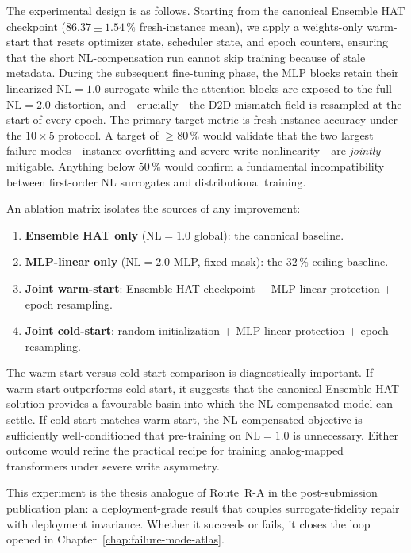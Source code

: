 The experimental design is as follows.  Starting from the canonical Ensemble HAT checkpoint ($86.37\pm1.54\,\%$ fresh-instance mean), we apply a weights-only warm-start that resets optimizer state, scheduler state, and epoch counters, ensuring that the short NL-compensation run cannot skip training because of stale metadata.  During the subsequent fine-tuning phase, the MLP blocks retain their linearized $\mathrm{NL}=1.0$ surrogate while the attention blocks are exposed to the full $\mathrm{NL}=2.0$ distortion, and---crucially---the D2D mismatch field is resampled at the start of every epoch.  The primary target metric is fresh-instance accuracy under the $10 \times 5$ protocol.  A target of $\ge 80\,\%$ would validate that the two largest failure modes---instance overfitting and severe write nonlinearity---are \emph{jointly} mitigable.  Anything below $50\,\%$ would confirm a fundamental incompatibility between first-order NL surrogates and distributional training.

An ablation matrix isolates the sources of any improvement:
\begin{enumerate}
    \item \textbf{Ensemble HAT only} ($\mathrm{NL}=1.0$ global): the canonical baseline.
    \item \textbf{MLP-linear only} ($\mathrm{NL}=2.0$ MLP, fixed mask): the $32\,\%$ ceiling baseline.
    \item \textbf{Joint warm-start}: Ensemble HAT checkpoint + MLP-linear protection + epoch resampling.
    \item \textbf{Joint cold-start}: random initialization + MLP-linear protection + epoch resampling.
\end{enumerate}
The warm-start versus cold-start comparison is diagnostically important.  If warm-start outperforms cold-start, it suggests that the canonical Ensemble HAT solution provides a favourable basin into which the NL-compensated model can settle.  If cold-start matches warm-start, the NL-compensated objective is sufficiently well-conditioned that pre-training on $\mathrm{NL}=1.0$ is unnecessary.  Either outcome would refine the practical recipe for training analog-mapped transformers under severe write asymmetry.

This experiment is the thesis analogue of Route~R-A in the post-submission publication plan: a deployment-grade result that couples surrogate-fidelity repair with deployment invariance.  Whether it succeeds or fails, it closes the loop opened in Chapter~\ref{chap:failure-mode-atlas}.

